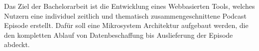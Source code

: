 Das Ziel der Bachelorarbeit ist die Entwicklung eines Webbasierten Tools, welches Nutzern eine individuel zeitlich und thematisch zusammengeschnittene Podcast Episode erstellt. Dafür soll eine Mikrosystem Architektur aufgebaut werden, die den kompletten Ablauf von Datenbeschaffung bis Auslieferung der Episode abdeckt. 